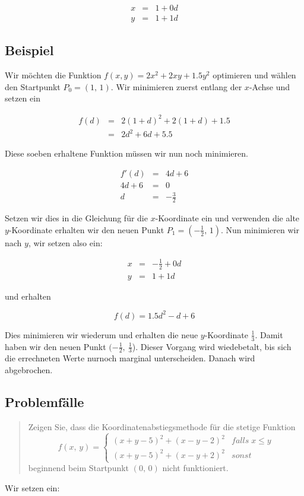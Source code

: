 \documentclass[naustrian]{article}
\begin{document}
{\begin{eqnarray*}
    x & = & 1+0d\\
    y & = & 1+1d
\end{eqnarray*}

\subsection{Beispiel}

Wir möchten die Funktion $f(x,y)=2x^{2}+2xy+1.5y^{2}$ optimieren
und wählen den Startpunkt $P_{0}=(1,\,1)$. Wir minimieren zuerst
entlang der $x$-Achse und setzen ein

\begin{eqnarray*}
    f(d) & = & 2(1+d)^{2}+2(1+d)+1.5\\
    & = & 2d^{2}+6d+5.5
\end{eqnarray*}

Diese soeben erhaltene Funktion müssen wir nun noch minimieren.

\begin{eqnarray*}
    f'(d) & = & 4d+6\\
    4d+6 & = & 0\\
    d & = & - \frac{3}{2}
\end{eqnarray*}


Setzen wir dies in die Gleichung für die $x$-Koordinate ein und verwenden
die alte $y$-Koordinate erhalten wir den neuen Punkt $P_{1}=(-\frac{1}{2},\,1)$.
Nun minimieren wir nach $y$, wir setzen also ein:

\begin{eqnarray*}
    x & = & -\frac{1}{2}+0d\\
    y & = & 1+1d
\end{eqnarray*}

und erhalten

\[
    f(d)=1.5d^{2}-d+6
\]

Dies minimieren wir wiederum und erhalten die neue $y$-Koordinate
$\frac{1}{3}$. Damit haben wir den neuen Punkt $(-\frac{1}{2},\:\frac{1}{3}$).
Dieser Vorgang wird wiedebetalt, bis sich die errechneten Werte nurnoch
marginal unterscheiden. Danach wird abgebrochen.

\subsection{Problemfälle}
\begin{quotation}
    \noindent Zeigen Sie, dass die Koordinatenabstiegsmethode für die stetige Funktion
    \[
        f(x,\,y)=
        \begin{cases}
            (x+y-5)^{2}+(x-y-2)^{2} & falls\;x\le y\\
            (x+y-5)^{2}+(x-y+2)^{2} & sonst
        \end{cases}
    \]
    beginnend beim Startpunkt $(0,\,0)$ nicht funktioniert.
\end{quotation}
Wir setzen ein:

}
\end{document}
